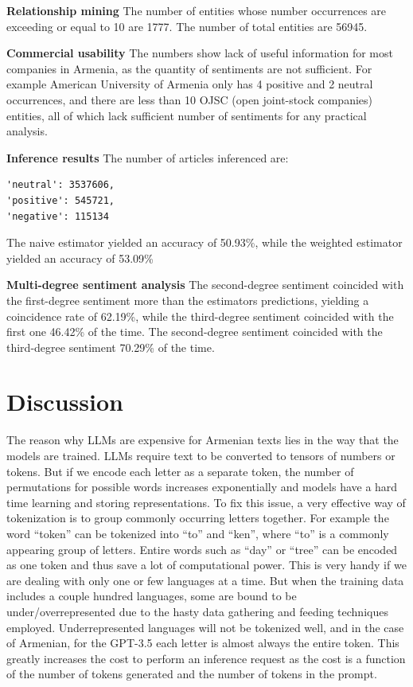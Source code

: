 \documentclass{IEEEtran}
\begin{document}
\textbf{Relationship mining}
The number of entities whose number occurrences are exceeding or equal to 10 are 1777. The number of total entities are 56945.

\textbf{Commercial usability}
The numbers show lack of useful information for most companies in Armenia, as the quantity of sentiments are not sufficient. For example American University of Armenia only has 4 positive and 2 neutral occurrences, and there are less than 10 OJSC (open joint-stock companies) entities, all of which lack sufficient number of sentiments for any practical analysis. 

\textbf{Inference results}
The number of articles inferenced are: 
\begin{verbatim}
'neutral': 3537606,
'positive': 545721,
'negative': 115134
\end{verbatim}
The naive estimator yielded an accuracy of 50.93\%, while the weighted estimator yielded an accuracy of 53.09\%

\textbf{Multi-degree sentiment analysis}
The second-degree sentiment coincided with the first-degree sentiment more than the estimators predictions, yielding a coincidence rate of 62.19\%, while the third-degree sentiment coincided with the first one 46.42\% of the time. The second-degree sentiment coincided with the third-degree sentiment 70.29\% of the time.



\section{Discussion}
The reason why LLMs are expensive for Armenian texts lies in the way that the models are trained. LLMs require text to be converted to tensors of numbers or tokens. But if we encode each letter as a separate token, the number of permutations for possible words increases exponentially and models have a hard time learning and storing representations. To fix this issue, a very effective way of tokenization is to group commonly occurring letters together. For example the word “token” can be tokenized into “to” and “ken”, where “to” is a commonly appearing group of letters. Entire words such as “day” or “tree” can be encoded as one token and thus save a lot of computational power. This is very handy if we are dealing with only one or few languages at a time. But when the training data includes a couple hundred languages, some are bound to be under/overrepresented due to the hasty data gathering and feeding techniques employed. Underrepresented languages will not be tokenized well, and in the case of Armenian, for the GPT-3.5 each letter is almost always the entire token. This greatly increases the cost to perform an inference request as the cost is a function of the number of tokens generated and the number of tokens in the prompt.
\end{document}
